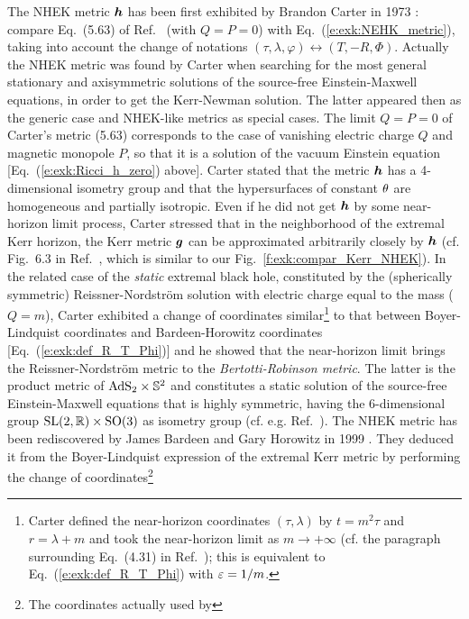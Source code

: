 \begin{hist} \label{h:exk:NHEK_metric}
The NHEK metric $\bm{h}$ has been first exhibited by Brandon Carter in 1973 \cite{Carte73a}:
compare Eq.~(5.63) of Ref.~\cite{Carte73a} (with $Q=P=0$) with Eq.~(\ref{e:exk:NEHK_metric}),
taking into account the change of notations $(\tau,\lambda,\varphi) \leftrightarrow (T,-R,\Phi)$.
Actually the NHEK metric was found by Carter when searching for the most general stationary
and axisymmetric solutions of the source-free Einstein-Maxwell equations, in order to get
the Kerr-Newman solution. The latter appeared then as the generic case and NHEK-like metrics as
special cases. The limit $Q=P=0$ of Carter's metric (5.63) corresponds to the case
of vanishing electric charge $Q$ and magnetic monopole $P$, so that it is a solution
of the vacuum Einstein equation  [Eq.~(\ref{e:exk:Ricci_h_zero}) above].
Carter stated that the metric $\bm{h}$ has a
4-dimensional isometry group and that the hypersurfaces of constant $\theta$ are
homogeneous and partially isotropic.
Even if he did not get $\bm{h}$ by some near-horizon limit process,
Carter stressed that in the neighborhood of the extremal Kerr horizon,
the Kerr metric $\bm{g}$ can
be approximated arbitrarily closely by $\bm{h}$
(cf. Fig.~6.3 in Ref.~\cite{Carte73a}, which is similar to our Fig.~\ref{f:exk:compar_Kerr_NHEK}).
In the related case of the \emph{static} extremal black hole,
constituted by the (spherically symmetric)
Reissner-Nordström solution
with electric charge equal to the mass ($Q = m$), Carter exhibited
a change of coordinates similar\footnote{Carter defined the near-horizon coordinates
$(\tau,\lambda)$ by $t = m^2 \tau$ and $r = \lambda + m$ and took the
near-horizon limit as $m\to +\infty$
(cf. the paragraph surrounding Eq.~(4.31) in Ref.~\cite{Carte73a});
this is equivalent to Eq.~(\ref{e:exk:def_R_T_Phi})
with $\varepsilon = 1/m$.}
to that between Boyer-Lindquist coordinates
and Bardeen-Horowitz coordinates [Eq.~(\ref{e:exk:def_R_T_Phi})] and
he showed that the near-horizon limit brings
the Reissner-Nordström metric to the
\emph{Bertotti-Robinson metric}.
The latter is the product metric of $\mathrm{AdS}_2\times\mathbb{S}^2$ and constitutes a static solution of
the source-free Einstein-Maxwell equations that is highly symmetric, having the 6-dimensional
group $\mathrm{SL}(2,\mathbb{R})\times\mathrm{SO}(3)$ as isometry group (cf. e.g. Ref.~\cite{GarfiG11}).
The NHEK metric has been rediscovered by James Bardeen and Gary Horowitz in 1999 \cite{BardeH99}. They deduced it from the Boyer-Lindquist expression of the extremal Kerr metric by performing the change of coordinates\footnote{The coordinates actually used by
}
\end{hist}
